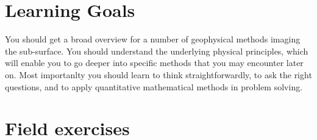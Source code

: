 \documentclass[letterpaper]{inzane_syllabus} %
\begin{document}

\section{Learning Goals}

You should get a broad overview for a number of geophysical methods imaging the sub-surface. You should understand the underlying physical principles, which will enable you to go deeper into specific methods that you may encounter later on. Most importanlty you should learn to think straightforwardly, to ask the right questions, and to apply quantitative mathematical methods in problem solving.
    

 
\vspace{0.5cm}
\section{Field exercises}
\end{document}
